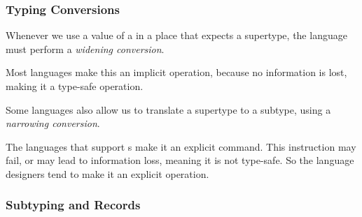 \subsubsection{Typing Conversions}\label{subsubsec:Typing_Conversions}
\begin{definition}\label{def:Widening_Conversion}
  Whenever we use a value of a  in a place that expects a supertype, the language must perform a \emph{widening conversion}.

  \begin{remark}[Implicit]\label{rmk:Widening_Conversion_Implicit}
    Most languages make this an implicit operation, because no information is lost, making it a type-safe operation.
  \end{remark}
\end{definition}

\begin{definition}\label{def:Narrowing_Conversion}
  Some languages also allow us to translate a supertype to a subtype, using a \emph{narrowing conversion}.

  \begin{remark}[Explicit]\label{rmk:Narrowing_Conversion_Explicit}
    The languages that support s make it an explicit command.
    This instruction may fail, or may lead to information loss, meaning it is not type-safe.
    So the language designers tend to make it an explicit operation.
  \end{remark}
\end{definition}

\subsubsection{Subtyping and Records}\label{subsubsec:Subtyping_and_Records}


